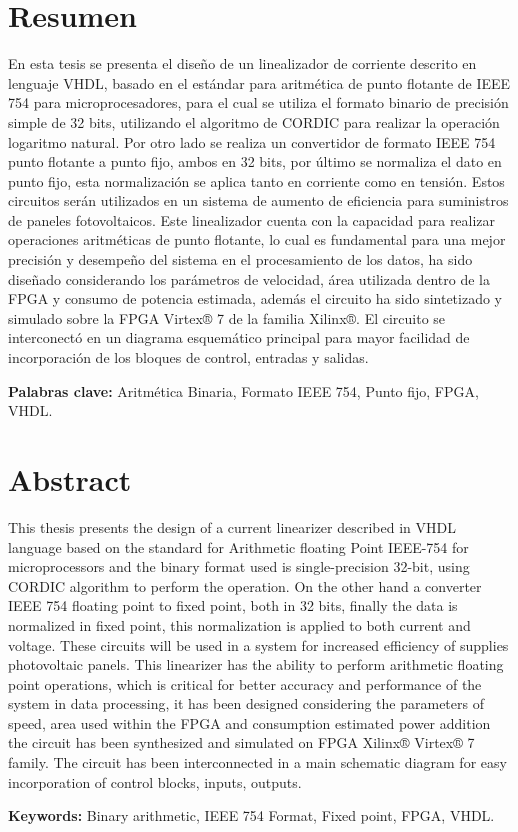 \chapter*{Resumen}
\thispagestyle{empty}

En esta tesis se presenta el diseño de un linealizador de corriente descrito en lenguaje VHDL, basado en el estándar para aritmética de punto flotante de IEEE 754 para microprocesadores, para el cual se utiliza el formato binario de precisión simple de 32 bits, utilizando el algoritmo de CORDIC para realizar la operación logaritmo natural. Por otro lado se realiza un convertidor de formato IEEE 754 punto flotante a punto fijo, ambos en 32 bits, por último se normaliza el dato en punto fijo, esta normalización se aplica tanto en corriente como en tensión. Estos circuitos serán utilizados en un sistema de aumento de eficiencia para suministros de paneles fotovoltaicos. Este linealizador cuenta con la capacidad para realizar operaciones aritméticas de punto flotante, lo cual es fundamental para una mejor precisión y desempeño del sistema en el procesamiento de los datos, ha sido diseñado considerando los parámetros de velocidad, área utilizada dentro de la FPGA y consumo de potencia estimada, además el circuito ha sido sintetizado y simulado sobre la FPGA Virtex® 7 de la familia Xilinx®. El circuito se interconectó en un diagrama esquemático principal para mayor facilidad de incorporación de los bloques de control, entradas y salidas.
 

\bigskip

\textbf{Palabras clave:} Aritmética Binaria, Formato IEEE 754, Punto fijo, FPGA, VHDL.





\clearpage
\chapter*{Abstract}
\thispagestyle{empty}

This thesis presents the design of a current linearizer described in VHDL language based on the standard for Arithmetic floating Point IEEE-754 for microprocessors and the binary format used is single-precision 32-bit, using CORDIC algorithm to perform the operation. On the other hand a converter IEEE 754 floating point to fixed point, both in 32 bits, finally the data is normalized in fixed point, this normalization is applied to both current and voltage. These circuits will be used in a system for  increased efficiency of supplies photovoltaic panels. This linearizer has the ability to perform arithmetic floating point operations, which is critical for better accuracy and performance of the system in data processing, it has been designed considering the parameters of speed, area used within the FPGA and consumption estimated power addition the circuit has been synthesized and simulated on FPGA Xilinx® Virtex® 7 family. The circuit has been interconnected in a main schematic diagram for easy incorporation of control blocks, inputs, outputs.


\bigskip

\textbf{Keywords:} Binary arithmetic, IEEE 754 Format, Fixed point, FPGA, VHDL. 


